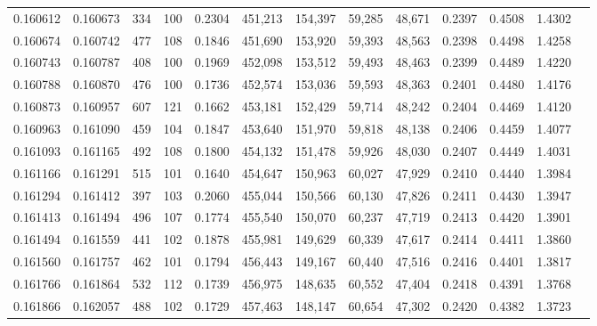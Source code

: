 \begin{tabular}{rrrrrrrrrrrrr}
0.160612 & 0.160673 &   334 & 100 &                                     0.2304 & 451,213 & 154,397 &  59,285 &  48,671 & 0.2397 & 0.4508 & 1.4302 \\
0.160674 & 0.160742 &   477 & 108 &                                     0.1846 & 451,690 & 153,920 &  59,393 &  48,563 & 0.2398 & 0.4498 & 1.4258 \\
0.160743 & 0.160787 &   408 & 100 &                                     0.1969 & 452,098 & 153,512 &  59,493 &  48,463 & 0.2399 & 0.4489 & 1.4220 \\
0.160788 & 0.160870 &   476 & 100 &                                     0.1736 & 452,574 & 153,036 &  59,593 &  48,363 & 0.2401 & 0.4480 & 1.4176 \\
0.160873 & 0.160957 &   607 & 121 &                                     0.1662 & 453,181 & 152,429 &  59,714 &  48,242 & 0.2404 & 0.4469 & 1.4120 \\
0.160963 & 0.161090 &   459 & 104 &                                     0.1847 & 453,640 & 151,970 &  59,818 &  48,138 & 0.2406 & 0.4459 & 1.4077 \\
0.161093 & 0.161165 &   492 & 108 &                                     0.1800 & 454,132 & 151,478 &  59,926 &  48,030 & 0.2407 & 0.4449 & 1.4031 \\
0.161166 & 0.161291 &   515 & 101 &                                     0.1640 & 454,647 & 150,963 &  60,027 &  47,929 & 0.2410 & 0.4440 & 1.3984 \\
0.161294 & 0.161412 &   397 & 103 &                                     0.2060 & 455,044 & 150,566 &  60,130 &  47,826 & 0.2411 & 0.4430 & 1.3947 \\
0.161413 & 0.161494 &   496 & 107 &                                     0.1774 & 455,540 & 150,070 &  60,237 &  47,719 & 0.2413 & 0.4420 & 1.3901 \\
0.161494 & 0.161559 &   441 & 102 &                                     0.1878 & 455,981 & 149,629 &  60,339 &  47,617 & 0.2414 & 0.4411 & 1.3860 \\
0.161560 & 0.161757 &   462 & 101 &                                     0.1794 & 456,443 & 149,167 &  60,440 &  47,516 & 0.2416 & 0.4401 & 1.3817 \\
0.161766 & 0.161864 &   532 & 112 &                                     0.1739 & 456,975 & 148,635 &  60,552 &  47,404 & 0.2418 & 0.4391 & 1.3768 \\
0.161866 & 0.162057 &   488 & 102 &                                     0.1729 & 457,463 & 148,147 &  60,654 &  47,302 & 0.2420 & 0.4382 & 1.3723 \\

\end{tabular}
